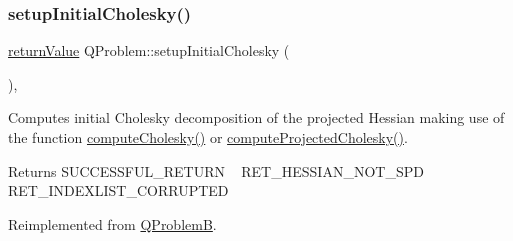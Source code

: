 \mbox{\label{class_q_problem_acb3d279975d00e5e459af3a7bb056658}} 
\subsubsection{\texorpdfstring{setup\+Initial\+Cholesky()}{setupInitialCholesky()}}
{\footnotesize\ttfamily \hyperlink{_message_handling_8hpp_a81d556f613bfbabd0b1f9488c0fa865e}{return\+Value} Q\+Problem\+::setup\+Initial\+Cholesky (\begin{DoxyParamCaption}{ }\end{DoxyParamCaption})\hspace{0.3cm}{\ttfamily [protected]}, {\ttfamily [virtual]}}

Computes initial Cholesky decomposition of the projected Hessian making use of the function \hyperlink{class_q_problem_b_a5f9fa59b80f990a897ba783e89dd03d3}{compute\+Cholesky()} or \hyperlink{class_q_problem_a0708ec4315696dd5462406cd0910bee2}{compute\+Projected\+Cholesky()}. \begin{DoxyReturn}{Returns}
S\+U\+C\+C\+E\+S\+S\+F\+U\+L\+\_\+\+R\+E\+T\+U\+RN ~\newline
 R\+E\+T\+\_\+\+H\+E\+S\+S\+I\+A\+N\+\_\+\+N\+O\+T\+\_\+\+S\+PD ~\newline
 R\+E\+T\+\_\+\+I\+N\+D\+E\+X\+L\+I\+S\+T\+\_\+\+C\+O\+R\+R\+U\+P\+T\+ED 
\end{DoxyReturn}


Reimplemented from \hyperlink{class_q_problem_b_afe7b38887f4823cecc668b99299d145b}{Q\+ProblemB}.

\mbox{\label{class_q_problem_a795e8ecc363ab25f15ffaf12a9ec4040}} 
